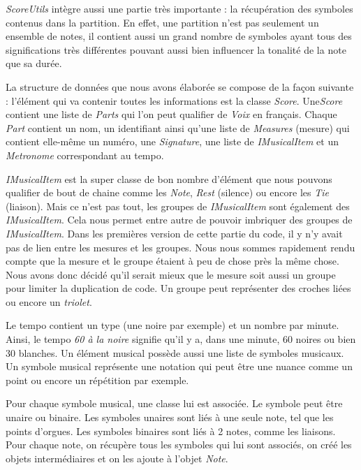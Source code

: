 \par
\emph{ScoreUtils} intègre aussi une partie très importante : la récupération des symboles contenus dans la partition. En effet, une partition n'est pas seulement un ensemble de notes, il contient aussi un grand nombre de symboles ayant tous des significations très différentes pouvant aussi bien influencer la tonalité de la note que sa durée.


\par
La structure de données que nous avons élaborée se compose de la façon suivante : l'élément qui va contenir toutes les informations est la classe \emph{Score}. Une\emph{Score} contient une liste de \emph{Parts} qui l'on peut qualifier de \emph{Voix} en français. Chaque \emph{Part} contient un nom, un identifiant ainsi qu'une liste de \emph{Measures} (mesure) qui contient elle-même un numéro, une \emph{Signature}, une liste de \emph{IMusicalItem} et un \emph{Metronome} correspondant au tempo.

\par
\emph{IMusicalItem} est la super classe de bon nombre d'élément que nous pouvons qualifier de bout de chaine comme les \emph{Note}, \emph{Rest} (silence) ou encore les \emph{Tie} (liaison). Mais ce n'est pas tout, les groupes de \emph{IMusicalItem} sont également des \emph{IMusicalItem}. Cela nous permet entre autre de pouvoir imbriquer des groupes de \emph{IMusicalItem}. Dans les premières version de cette partie du code, il y n'y avait pas de lien entre les mesures et les groupes. Nous nous sommes rapidement rendu compte que la mesure et le groupe étaient à peu de chose près la même chose. Nous avons donc décidé qu'il serait mieux que le mesure soit aussi un groupe pour limiter la duplication de code. Un groupe peut représenter des croches liées ou encore un \emph{triolet}.

\par
Le tempo contient un type (une noire par exemple) et un nombre par minute. Ainsi, le tempo \emph{60 à la noire} signifie qu'il y a, dans une minute, 60 noires ou bien 30 blanches. Un élément musical possède aussi une liste de symboles musicaux. Un symbole musical représente une notation qui peut être une nuance comme un point ou encore un répétition par exemple.

\par
Pour chaque symbole musical, une classe lui est associée. Le symbole peut être unaire ou binaire. Les symboles unaires sont liés à une seule note, tel que les points d'orgues. Les symboles binaires sont liés à 2 notes, comme les liaisons. Pour chaque note, on récupère tous les symboles qui lui sont associés, on créé les objets intermédiaires et on les ajoute à l'objet \emph{Note}.


